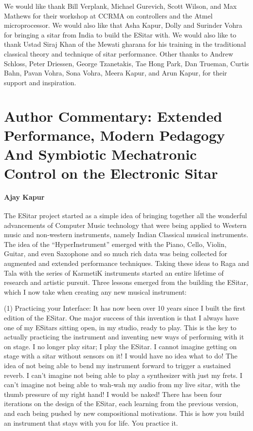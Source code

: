 \begin{acknowledgement}
We would like thank Bill Verplank, Michael Gurevich, Scott Wilson, and Max Mathews for their workshop at CCRMA on controllers and the Atmel microprocessor. We would also like that Asha Kapur, Dolly and Surinder Vohra for bringing a sitar from India to build the ESitar with. We would also like to thank Ustad Siraj Khan of the Mewati gharana for his training in the traditional classical theory and technique of sitar performance. Other thanks to Andrew Schloss, Peter Driessen, George Tzanetakis, Tae Hong Park, Dan Trueman, Curtis Bahn, Pavan Vohra, Sona Vohra, Meera Kapur, and Arun Kapur, for their support and inspiration.
\end{acknowledgement}


\section*{Author Commentary: Extended Performance, Modern Pedagogy And Symbiotic Mechatronic Control on the Electronic Sitar}


\paragraph{Ajay Kapur}

The ESitar project started as a simple idea of bringing together all the wonderful advancements of Computer Music technology that  were being applied to Western music and non-western instruments, namely Indian Classical musical instruments. The idea of the ``HyperInstrument'' emerged with the Piano, Cello, Violin, Guitar, and even Saxophone and so much rich data was being collected for augmented and extended performance techniques. Taking these ideas to Raga and Tala with the series of KarmetiK instruments started an entire lifetime of research and artistic pursuit. Three lessons emerged from the building the ESitar, which I now take when creating any new musical instrument:

(1) Practicing your Interface: It has now been over 10 years since I built the first edition of the ESitar. One major success of this invention is that I always have one of my ESitars sitting open, in my studio, ready to play. This is the key to actually practicing the instrument and inventing new ways of performing with it on stage.  I no longer play sitar; I play the ESitar. I cannot imagine getting on stage with a sitar without sensors on it! I would have no idea what to do! The idea of not being able to bend my instrument forward to trigger a sustained reverb. I can't imagine not being able to play a synthesizer with just my frets. I can't imagine not being able to wah-wah my audio from my live sitar, with the thumb pressure of my right hand! I would be naked! There has been four iterations on the design of the ESitar, each learning from the previous version, and each being pushed by new compositional motivations. This is how you build an instrument that stays with you for life. You practice it. 


